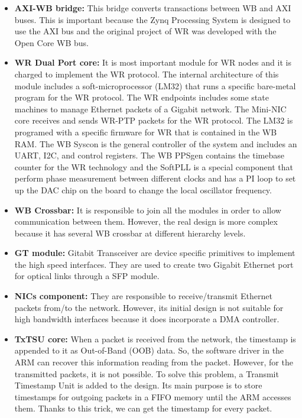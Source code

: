 \documentclass[review]{elsarticle}
\begin{document}
\begin{itemize}
	\item{\textbf{AXI-WB bridge:} This bridge converts transactions between WB and AXI buses. This is important because the Zynq Processing System is designed to use the AXI bus and the original project of WR was developed with the Open Core WB bus. }
	\item{\textbf{WR Dual Port core:} It is most important module for WR nodes and it is charged to implement the WR protocol. The internal architecture of this module includes a soft-microprocessor (LM32) that runs a specific bare-metal program for the WR protocol. The WR endpoints includes some state machines to manage Ethernet packets of a Gigabit network. The Mini-NIC core receives and sends WR-PTP packets for the WR protocol. The LM32 is programed with a specific firmware for WR that is contained in the WB RAM. The WB Syscon is the general controller of the system and includes an UART, I2C, and control registers. The WB PPSgen contains the timebase counter for the WR technology and the SoftPLL is a special component that perform phase measurement between different clocks and has a PI loop to set up the DAC chip on the board to change the local oscillator frequency. }
	\item{\textbf{WB Crossbar:} It is responsible to join all the modules in order to allow communication between them. However, the real design is more complex because it has several WB crossbar at different hierarchy levels. }
	\item{\textbf{GT module:} Gitabit Transceiver are device specific primitives to implement the high speed interfaces. They are used to create two Gigabit Ethernet port for optical links through a SFP module.}
	\item{\textbf{NICs component:} They are responsible to receive/transmit Ethernet packets from/to the network. However, its initial design is not suitable for high bandwidth interfaces because it does incorporate a DMA controller. 
	}
	\item{\textbf{TxTSU core:} When a packet is received from the network, the timestamp is appended to it as Out-of-Band (OOB) data. So, the software driver in the ARM can recover this information reading from the packet. However, for the transmitted packets, it is not possible. To solve this problem, a Transmit Timestamp Unit is added to the design. Its main purpose is to store timestamps for outgoing packets in a FIFO memory until the ARM accesses them. Thanks to this trick, we can get the timestamp for every packet. 
		
}
\end{itemize}
\end{document}

